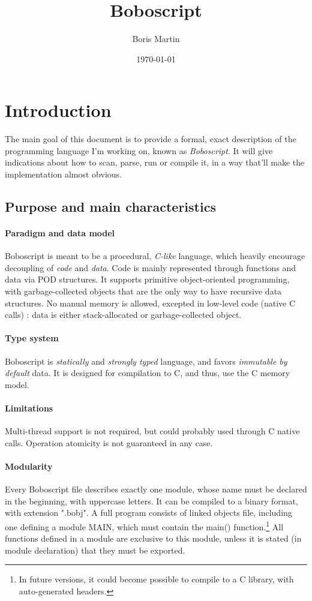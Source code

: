 \documentclass[a4paper, 12pt]{article}
\begin{document}
	\title{Boboscript}
	\author{Boris Martin}
	\date{\today}
	\maketitle

	\tableofcontents
	\newpage

	\section{Introduction}
	The main goal of this document is to provide a formal, exact description of the programming language I'm working on, known as \textit{Boboscript}. It will give indications about how to scan, parse, run or compile it, in a way that'll make the implementation almost obvious.
	
	\subsection{Purpose and main characteristics}
	\paragraph{Paradigm and data model}
	Boboscript is meant to be a procedural, \textit{C-like} language, which heavily encourage decoupling of \textit{code} and \textit{data}. Code is mainly represented through functions and data via POD structures. It supports primitive object-oriented programming, with garbage-collected objects that are the only way to have recursive data structures. No manual memory is allowed, excepted in low-level code (native C calls) : data is either stack-allocated or garbage-collected object.
	\paragraph{Type system}
	Boboscript is \textit{statically} and \textit{strongly typed} language, and favors \textit{immutable by default} data. It is designed for compilation to C, and thus, use the C memory model.
	\paragraph{Limitations}
	Multi-thread support is not required, but could probably used through C native calls. Operation atomicity is not guaranteed in any case.
	\paragraph{Modularity}
	Every Boboscript file describes exactly one module, whose name must be declared in the beginning, with uppercase letters. It can be compiled to a binary format, with extension ".bobj". A full program consists of linked objects file, including one defining a module MAIN, which must contain the main() function.\footnote{In future versions, it could become possible to compile to a C library, with auto-generated headers.}\newline
	All functions defined in a module are exclusive to this module, unless it is stated (in module declaration) that they must be exported.
	
\end{document}
